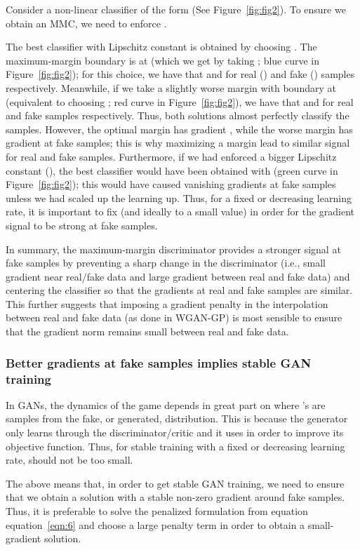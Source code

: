 \documentclass{article}
\def\eqref#1{equation~\ref{#1}}
\begin{document}
Consider a non-linear classifier of the form  (See Figure~\ref{fig:fig2}). To ensure we obtain an MMC, we need to enforce .

The best classifier with Lipschitz constant  is obtained by choosing . The maximum-margin boundary is at  (which we get by taking ; blue curve in Figure~\ref{fig:fig2}); for this choice, we have that  and  for real () and fake () samples respectively. Meanwhile, if we take a slightly worse margin with boundary at  (equivalent to choosing ; red curve in Figure~\ref{fig:fig2}), we have that  and  for real and fake samples respectively. Thus, both solutions almost perfectly classify the samples. However, the optimal margin has gradient , while the worse margin has gradient  at fake samples; this is why maximizing a margin lead to similar signal for real and fake samples. Furthermore, if we had enforced a bigger Lipschitz constant (), the best classifier would have been obtained with  (green curve in Figure~\ref{fig:fig2}); this would have caused vanishing gradients at fake samples unless we had scaled up the learning up. Thus, for a fixed or decreasing learning rate, it is important to fix  (and ideally to a small value) in order for the gradient signal to be strong at fake samples.

In summary, the maximum-margin discriminator provides a stronger signal at fake samples by preventing a sharp change in the discriminator (i.e., small gradient near real/fake data and large gradient between real and fake data) and centering the classifier so that the gradients at real and fake samples are similar. This further suggests that imposing a gradient penalty in the interpolation between real and fake data (as done in WGAN-GP) is most sensible to ensure that the gradient norm remains small between real and fake data. 

\subsubsection{Better gradients at fake samples implies stable GAN training}

In GANs, the dynamics of the game depends in great part on  where 's are samples from the fake, or generated, distribution.
This is because the generator only learns through the discriminator/critic and it uses  in order to improve its objective function. Thus, for stable training with a fixed or decreasing learning rate,  should not be too small.

The above means that, in order to get stable GAN training, we need to ensure that we obtain a solution with a stable non-zero gradient around fake samples. Thus, it is preferable to solve the penalized formulation from equation \eqref{eqn:6} and choose a large penalty term  in order to obtain a small-gradient solution. 
\end{document}
